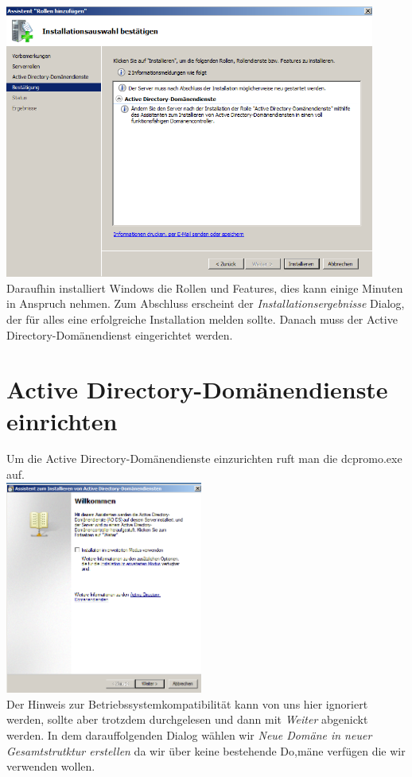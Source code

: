 \documentclass[12pt,a4paper,titlepage]{article} %
\begin{document}
 	\includegraphics[height=9cm]{Bilder/011}\\
 
Daraufhin installiert Windows die Rollen und Features, dies kann einige Minuten in Anspruch nehmen. Zum Abschluss erscheint der \emph{Installationsergebnisse} Dialog, der für alles eine erfolgreiche Installation melden sollte. Danach muss der Active Directory-Domänendienst eingerichtet werden.
 
 \newpage
 \section{Active Directory-Domänendienste einrichten}
Um die Active Directory-Domänendienste einzurichten ruft man die dcpromo.exe auf.\\

	\includegraphics[height=7cm]{Bilder/014(dcpromo_exe01)}\\
	
Der Hinweis zur Betriebssystemkompatibilität kann von uns hier ignoriert werden, sollte aber trotzdem durchgelesen und dann mit \emph{Weiter} abgenickt werden. In dem darauffolgenden Dialog wählen wir \emph{Neue Domäne in neuer Gesamtstrutktur erstellen} da wir über keine bestehende Do,mäne verfügen die wir verwenden wollen.\\
\end{document}
